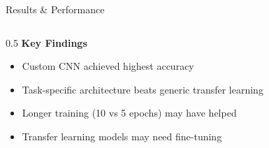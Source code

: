 \documentclass[aspectratio=169]{beamer}
\begin{document}
\begin{frame}{Results \& Performance}
\begin{columns}[T]
\begin{column}{0.5\textwidth}
            \vspace{0.3cm}
            \textbf{Key Findings}
            \begin{itemize}
                \scriptsize
                \item Custom CNN achieved highest accuracy
                \item Task-specific architecture beats generic transfer learning
                \item Longer training (10 vs 5 epochs) may have helped
                \item Transfer learning models may need fine-tuning
            \end{itemize}
        \end{column}
    \end{columns}
\end{frame}
\end{document}
